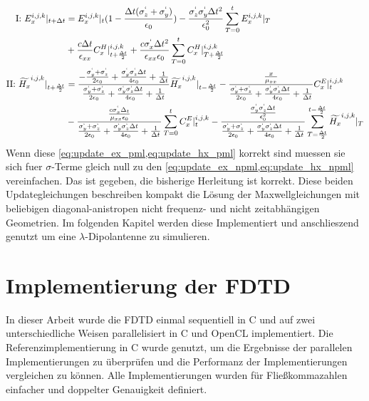 \documentclass[11pt, ngerman]{article}
\begin{document}
\begin{align}
	\text{I: } \Ef{x}{i,j,k}{+} &= \Ef{x}{i,j,k}{0}(1-\frac{\Delta t(\sgma_z+\sgma_y)}{\epsilon_0}) - \frac{\sgma_z\sgma_y\Delta t^2}{\epsilon_0^2}\sum_{T=0}^t\Ef{x}{i,j,k}{T}\nonumber\\
	&+ \frac{c\Delta t}{\epsilon_{xx}}\Ch{x}{i,j,k}{+} + \frac{c\sgma_x\Delta t^2}{\epsilon_{xx}\epsilon_0}\sum_{T=0}^t\Ch{x}{i,j,k}{T+} \label{eq:update_ex_pml}\\
	\text{II: } \Hf{x}{i,j,k}{+} &= \frac{\fone}{\mone}\Hf{x}{i,j,k}{-}-\frac{\frac{x}{\mu_{xx}}}{\mone}\Ce{x}{i,j,k}{0} \label{eq:update_hx_pml}\nonumber\\
	&- \frac{\frac{c\sgma_x\Delta_t}{\mu_{xx}\epsilon_0}}{\mone}\sum_{T=0}^t\Ce{x}{i,j,k}{0}-\frac{\frac{\sgma_y\sgma_z\Delta t}{\epsilon_0^2}}{\mone}\sum_{T=\frac{\Delta t}{2}}^{t-\frac{\Delta t}{2}}\Hf{x}{i,j,k}{T}
\end{align}
Wenn diese \cref{eq:update_ex_pml,eq:update_hx_pml} korrekt sind muessen sie sich fuer \(\sigma\)-Terme gleich null zu den \cref{eq:update_ex_npml,eq:update_hx_npml}
vereinfachen. Das ist gegeben, die bisherige Herleitung ist korrekt.
Diese beiden Updategleichungen beschreiben kompakt die L\"osung der Maxwellgleichungen mit beliebigen diagonal-anistropen nicht frequenz- und nicht
zeitabh\"angigen Geometrien.
Im folgenden Kapitel werden diese Implementiert und anschlieszend genutzt um eine \(\lambda\)-Dipolantenne zu simulieren.

\section{Implementierung der FDTD}
In dieser Arbeit wurde die FDTD einmal sequentiell in C und auf zwei unterschiedliche Weisen parallelisiert in C und OpenCL implementiert.
Die Referenzimplementierung in C wurde genutzt, um die Ergebnisse der parallelen Implementierungen
zu \"uberpr\"ufen und die Performanz der Implementierungen vergleichen zu k\"onnen.
Alle Implementierungen wurden f\"ur Flie{\ss}kommazahlen einfacher und doppelter Genauigkeit definiert.
\end{document}

